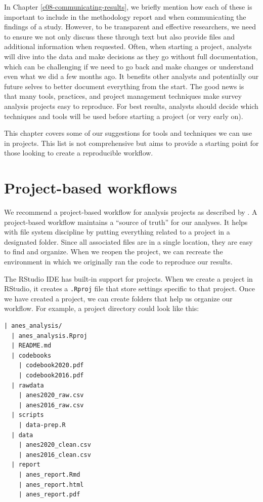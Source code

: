 \documentclass[
]{krantz}
\begin{document}
In Chapter \ref{c08-communicating-results}, we briefly mention how each of these is important to include in the methodology report and when communicating the findings of a study. However, to be transparent and effective researchers, we need to ensure we not only discuss these through text but also provide files and additional information when requested. Often, when starting a project, analysts will dive into the data and make decisions as they go without full documentation, which can be challenging if we need to go back and make changes or understand even what we did a few months ago. It benefits other analysts and potentially our future selves to better document everything from the start. The good news is that many tools, practices, and project management techniques make survey analysis projects easy to reproduce. For best results, analysts should decide which techniques and tools will be used before starting a project (or very early on).

This chapter covers some of our suggestions for tools and techniques we can use in projects. This list is not comprehensive but aims to provide a starting point for those looking to create a reproducible workflow.

\hypertarget{project-based-workflows}{%
\section{Project-based workflows}\label{project-based-workflows}}

We recommend a project-based workflow for analysis projects as described by \citet{wickham2023r4ds}. A project-based workflow maintains a ``source of truth'' for our analyses. It helps with file system discipline by putting everything related to a project in a designated folder. Since all associated files are in a single location, they are easy to find and organize. When we reopen the project, we can recreate the environment in which we originally ran the code to reproduce our results.

The RStudio IDE has built-in support for projects. When we create a project in RStudio, it creates a \texttt{.Rproj} file that store settings specific to that project. Once we have created a project, we can create folders that help us organize our workflow. For example, a project directory could look like this:

\begin{verbatim}
| anes_analysis/
  | anes_analysis.Rproj
  | README.md
  | codebooks
    | codebook2020.pdf
    | codebook2016.pdf
  | rawdata
    | anes2020_raw.csv
    | anes2016_raw.csv
  | scripts
    | data-prep.R
  | data
    | anes2020_clean.csv
    | anes2016_clean.csv
  | report
    | anes_report.Rmd
    | anes_report.html
    | anes_report.pdf
\end{verbatim}
\end{document}
